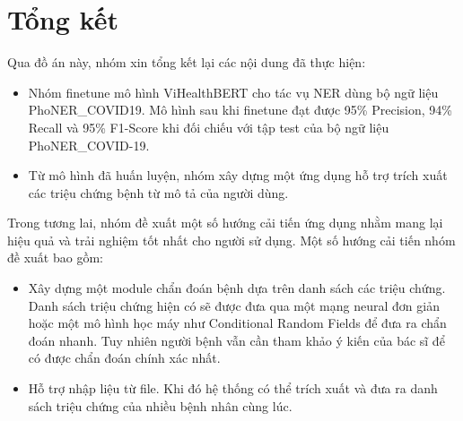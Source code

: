 \section{Tổng kết}
Qua đồ án này, nhóm xin tổng kết lại các nội dung đã thực hiện:
\begin{itemize}
\item Nhóm finetune mô hình ViHealthBERT cho tác vụ NER dùng bộ ngữ liệu PhoNER\_COVID19. Mô hình sau khi finetune đạt được 95\% Precision, 94\% Recall và 95\% F1-Score khi đối chiếu với tập test của bộ ngữ liệu PhoNER\_COVID-19.
\item Từ mô hình đã huấn luyện, nhóm xây dựng một ứng dụng hỗ trợ trích xuất các triệu chứng bệnh từ mô tả của người dùng.
\end{itemize}
Trong tương lai, nhóm đề xuất một số hướng cải tiến ứng dụng nhằm mang lại hiệu quả và trải nghiệm tốt nhất cho người sử dụng. Một số hướng cải tiến nhóm đề xuất bao gồm:
\begin{itemize}
\item Xây dựng một module chẩn đoán bệnh dựa trên danh sách các triệu chứng. Danh sách triệu chứng hiện có sẽ được đưa qua một mạng neural đơn giản hoặc một mô hình học máy như Conditional Random Fields để đưa ra chẩn đoán nhanh. Tuy nhiên người bệnh vẫn cần tham khảo ý kiến của bác sĩ để có được chẩn đoán chính xác nhất.
\item Hỗ trợ nhập liệu từ file. Khi đó hệ thống có thể trích xuất và đưa ra danh sách triệu chứng của nhiều bệnh nhân cùng lúc.
\end{itemize}